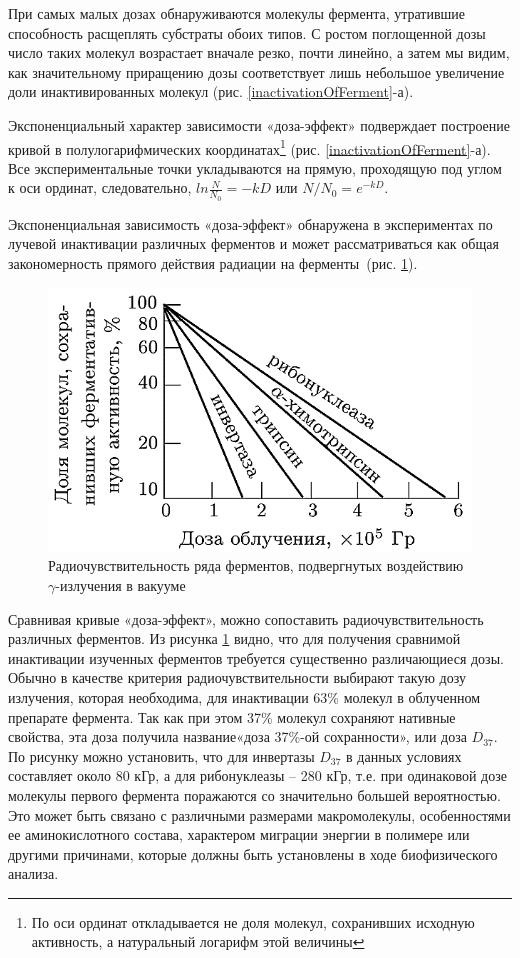 \documentclass[a4paper, 14pt]{article}
\begin{document}
При самых малых дозах обнаруживаются молекулы фермента, утратившие
способность расщеплять субстраты обоих типов. С ростом поглощенной дозы число
таких молекул возрастает вначале резко, почти линейно, а затем мы видим, как
значительному приращению дозы соответствует лишь небольшое увеличение доли
инактивированных молекул (рис. \ref{inactivationOfFerment}-а).

Экспоненциальный характер зависимости «доза-эффект»
подверждает построение кривой в полулогарифмических
координатах\footnote{По оси ординат откладывается не доля
молекул, сохранивших исходную активность, а натуральный логарифм этой
величины} (рис. \ref{inactivationOfFerment}-а). Все экспериментальные точки укладываются на прямую, проходящую под углом к оси ординат, следовательно, $ln\frac{N}{N_0} = -kD$ или $N/N_0 = e^{-kD}$.

Экспоненциальная зависимость «доза-эффект» обнаружена в экспериментах по
лучевой инактивации различных ферментов и может рассматриваться как общая
закономерность прямого действия радиации на ферменты~(рис. \ref{radioSensibility}).
\begin{figure}[htbp]
    \centering
    \includegraphics[width=.8\textwidth]{radioSensibility.png}
    \caption{Радиочувствительность ряда ферментов, подвергнутых воздействию $\gamma$-излучения в вакууме}
    \label{radioSensibility}
\end{figure}

Сравнивая кривые «доза-эффект», можно сопоставить радиочувствительность
различных ферментов. Из рисунка \ref{radioSensibility} видно, что для получения сравнимой инактивации изученных ферментов требуется существенно различающиеся дозы. Обычно в
качестве критерия радиочувствительности выбирают такую дозу излучения, которая
необходима, для инактивации 63\% молекул в облученном препарате фермента. Так
как при этом 37\% молекул сохраняют нативные свойства, эта доза получила название«доза 37\%-ой сохранности», или доза $D_{37}$. По рисунку можно установить, что для
инвертазы $D_{37}$ в данных условиях составляет около 80 кГр, а для рибонуклеазы – 280
кГр, т.е. при одинаковой дозе молекулы первого фермента поражаются со значительно
большей вероятностью. Это может быть связано с различными размерами
макромолекулы, особенностями ее аминокислотного состава, характером миграции
энергии в полимере или другими причинами, которые должны быть установлены в
ходе биофизического анализа.
\end{document}
